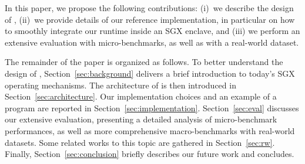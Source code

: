 
In this paper, we propose the following contributions: (i)~we describe the design of \SYS, (ii)~we provide details of our reference implementation, in particular on how to smoothly integrate our runtime inside an SGX enclave, and (iii) we perform an extensive evaluation with micro-benchmarks, as well as with a real-world dataset.

The remainder of the paper is organized as follows.
To better understand the design of \SYS, Section~\ref{sec:background} delivers a brief introduction to today's SGX operating mechanisms.
The architecture of \SYS{} is then introduced in Section~\ref{sec:architecture}.
Our implementation choices and an example of a \SYS{} program are reported in Section~\ref{sec:implementation}.
Section~\ref{sec:eval} discusses our extensive evaluation, presenting a detailed analysis of micro-benchmark performances, as well as more comprehensive macro-benchmarks with real-world datasets.
Some related works to this topic are gathered in Section~\ref{sec:rw}.
Finally, Section~\ref{sec:conclusion} briefly describes our future work and concludes.
